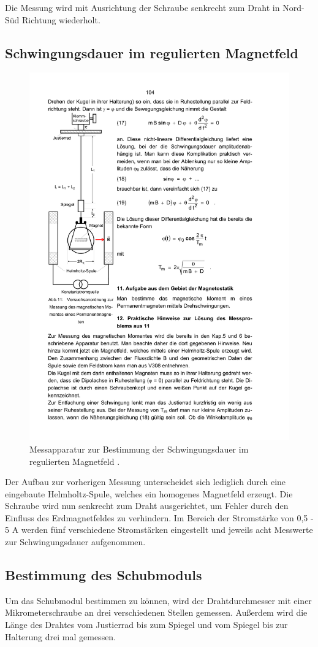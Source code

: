 Die Messung wird mit Ausrichtung der Schraube senkrecht zum Draht in Nord-Süd Richtung wiederholt.

\subsection{Schwingungsdauer im regulierten Magnetfeld}

\begin{figure}
\centering
\includegraphics[scale=0.7]{bilder/apparatur2.pdf}
\caption{Messapparatur zur Bestimmung der Schwingungsdauer im regulierten Magnetfeld \cite{anleitung102}.}
  \label{fig:apparatur2}
\end{figure}

Der Aufbau zur vorherigen Messung unterscheidet sich lediglich durch eine eingebaute Helmholtz-Spule, welches ein homogenes Magnetfeld erzeugt. Die Schraube wird nun senkrecht zum Draht ausgerichtet, um Fehler durch den Einfluss des Erdmagnetfeldes zu verhindern. Im Bereich der Stromstärke von 0,5 - 5 \si{\ampere} werden fünf verschiedene Stromstärken eingestellt und jeweils acht Messwerte zur Schwingungsdauer aufgenommen.

\subsection{Bestimmung des Schubmoduls}
Um das Schubmodul bestimmen zu können, wird der Drahtdurchmesser mit einer Mikrometerschraube an drei verschiedenen Stellen gemessen.  Außerdem wird die Länge des Drahtes vom Justierrad bis zum Spiegel und vom Spiegel bis zur Halterung drei mal gemessen.
